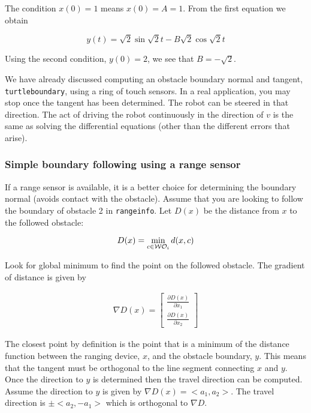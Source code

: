 The condition \(x(0) = 1\) means \(x(0) = A = 1\). From the first
equation we obtain

\[y(t) = \sqrt{2}\sin\sqrt{2}t - B\sqrt{2}\cos\sqrt{2}t\]

Using the second condition, \(y(0)=2\), we see that \(B = -\sqrt{2}\).

We have already discussed computing an obstacle boundary normal and
tangent, \texttt{turtleboundary}, using a ring of touch sensors. In a
real application, you may stop once the tangent has been determined. The
robot can be steered in that direction. The act of driving the robot
continuously in the direction of \(v\) is the same as solving the
differential equations (other than the different errors that arise).

\hypertarget{simple-boundary-following-using-a-range-sensor}{%
\subsubsection{Simple boundary following using a range
sensor}\label{simple-boundary-following-using-a-range-sensor}}

If a range sensor is available, it is a better choice for determining
the boundary normal (avoids contact with the obstacle). Assume that you
are looking to follow the boundary of obstacle 2 in \texttt{rangeinfo}.
Let \(D(x)\) be the distance from \(x\) to the followed obstacle:

\[D(x) = \min_{c\in{\cal W}{\cal O}_i} d(x,c)\]

Look for global minimum to find the point on the followed obstacle. The
gradient of distance is given by

\[\begin{aligned}
\nabla D(x) = \begin{bmatrix} \displaystyle \frac{\partial D(x)}{\partial x_1}\\[5mm]
\displaystyle\frac{\partial D(x)}{\partial x_2}\end{bmatrix}
\end{aligned}\]

The closest point by definition is the point that is a minimum of the
distance function between the ranging device, \(x\), and the obstacle
boundary, \(y\). This means that the tangent must be orthogonal to the
line segment connecting \(x\) and \(y\). Once the direction to \(y\) is
determined then the travel direction can be computed. Assume the
direction to \(y\) is given by \(\nabla D(x) = <a_1,a_2>\). The travel
direction is \(\pm <a_2, -a_1>\) which is orthogonal to \(\nabla D\).

